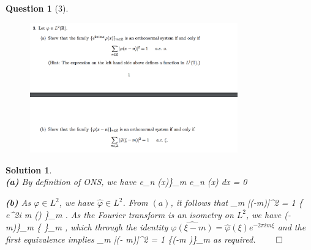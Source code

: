 \documentclass{article} %
\def\eQb#1\eQe{\begin{eqnarray*}#1\end{eqnarray*}}
\theoremstyle{quest}
\newtheorem*{question}{Question}
\newtheorem*{solution}{Solution}
\begin{document}
\begin{question}[3]
\hfill
\begin{figure}[h!]
  \centering
    \includegraphics[width=0.8\textwidth]{HA-5-3.png}
\end{figure}
\end{question}
\begin{solution} \hfill \\

\textbf{(a)} By definition of ONS, we have
\eQb
\{ e_n \varphi(x)\}_{m \in {}} \>  \iff 
\int e_n \varphi {}(x) dx = 0 
\eQe

\textbf{(b)}
As $\varphi \in L^2$, we have $\hat{\varphi} \in L^2$. From $(a)$, it follows that
\eQb
\sum_{m \in {}} |\hat{\varphi}(\xi-m)|^2 = 1 \>  \xi
\iff 
\{ e^{2\pi i m \xi} \hat{\varphi}(\xi) \}_{m \in {}} \> .
\eQe
As the Fourier transform is an isometry on $L^2$, we have
\eQb
\{ \varphi(\xi -m)\}_{m \in {}} \>  
\iff
\{ \}_{m \in {}} \> ,
\eQe 
which through the identity $\widehat{\varphi(\xi-m)} = \hat{\varphi}(\xi)e^{-2\pi i m\xi}$ 
and the first equivalence implies
\eQb
\sum_{m \in {}} |\hat{\varphi}(\xi - m)|^2 = 1 \>  \xi 
\iff
\{\varphi(\xi -m )\}_{m \in {}} \>  
\eQe
as required. \hfill $\qed$
\end{solution}

\newpage 
\end{document}
